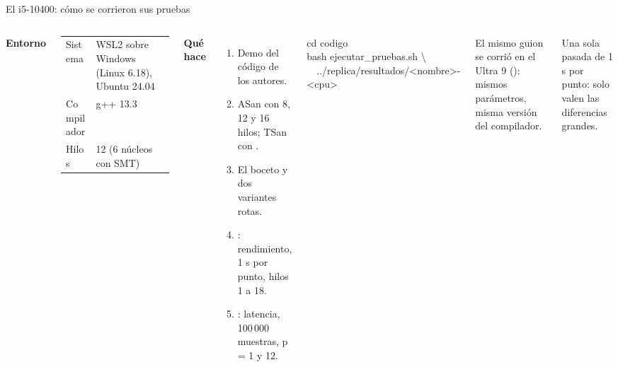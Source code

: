 \begin{frame}{El i5-10400: cómo se corrieron sus pruebas}
  \begin{columns}[T,onlytextwidth]
    \small
    \textbf{\color{marino}Entorno}\par\vspace{1mm}
    \footnotesize
    \begin{tabular}{@{}G{17mm}p{47mm}@{}}
      Sistema & WSL2 sobre Windows (Linux 6.18), Ubuntu 24.04\\
      Compilador & g++ 13.3\\
      Hilos & 12 (6 núcleos con SMT)\\
    \end{tabular}\par\vspace{2mm}
    \small\textbf{\color{marino}Qué hace }
    \begin{enumerate}\footnotesize
      \item Demo del código de los autores.
      \item ASan con 8, 12 y 16 hilos; TSan con .
      \item El boceto y dos variantes rotas.
      \item {}: rendimiento, 1 s por punto, hilos 1 a 18.
      \item {}: latencia, 100\,000 muestras, p = 1 y 12.
    \end{enumerate}
    \begin{tcolorbox}[colback=tinta,colupper=white,boxrule=0pt,arc=1.5pt,left=4pt,top=2pt,bottom=2pt,fontupper=\scriptsize\ttfamily]
      cd codigo\\
      bash ejecutar\_pruebas.sh \textbackslash\\
      \ \ ../replica/resultados/<nombre>-<cpu>
    \end{tcolorbox}
    \begin{idea}\footnotesize El mismo guion se corrió en el Ultra 9 (): mismos parámetros, misma versión del compilador.\end{idea}
    \begin{ojo}Una sola pasada de 1 s por punto: solo valen las diferencias grandes.\end{ojo}
  \end{columns}
\end{frame}
